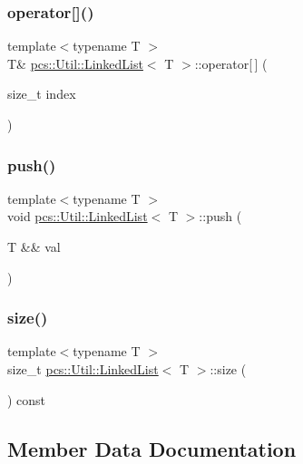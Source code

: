 \subsubsection{\texorpdfstring{operator[]()}{operator[]()}}
{\footnotesize\ttfamily template$<$typename T $>$ \\
T\& \hyperlink{classpcs_1_1Util_1_1LinkedList}{pcs\+::\+Util\+::\+Linked\+List}$<$ T $>$\+::operator\mbox{[}$\,$\mbox{]} (\begin{DoxyParamCaption}\item[{size\+\_\+t}]{index }\end{DoxyParamCaption})}

\mbox{\label{classpcs_1_1Util_1_1LinkedList_a79ddaedb4fbd61886c4326a9a9c34c5d}} 
\subsubsection{\texorpdfstring{push()}{push()}}
{\footnotesize\ttfamily template$<$typename T $>$ \\
void \hyperlink{classpcs_1_1Util_1_1LinkedList}{pcs\+::\+Util\+::\+Linked\+List}$<$ T $>$\+::push (\begin{DoxyParamCaption}\item[{T \&\&}]{val }\end{DoxyParamCaption})}

\mbox{\label{classpcs_1_1Util_1_1LinkedList_ac778698256b41a8085d3654056a4093a}} 
\subsubsection{\texorpdfstring{size()}{size()}}
{\footnotesize\ttfamily template$<$typename T $>$ \\
size\+\_\+t \hyperlink{classpcs_1_1Util_1_1LinkedList}{pcs\+::\+Util\+::\+Linked\+List}$<$ T $>$\+::size (\begin{DoxyParamCaption}{ }\end{DoxyParamCaption}) const}



\subsection{Member Data Documentation}
\mbox{\label{classpcs_1_1Util_1_1LinkedList_a3ce4faa5435a6f24917d9887ed8124d3}} 
